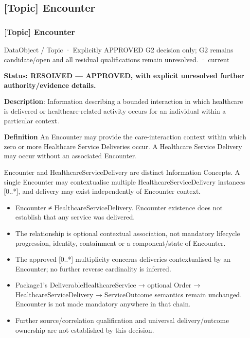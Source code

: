 \subsection{[Topic] Encounter}

\subsubsection{[Topic] Encounter}

\label{element:fb464349f13b41c4ae9920a743fc6c12}
{\small DataObject / Topic · Explicitly APPROVED G2 decision only; G2 remains candidate/open and all residual qualifications remain unresolved. · current}\par

\textbf{Status: RESOLVED — APPROVED, with explicit unresolved further authority/evidence details.}



\textbf{Description}: Information describing a bounded interaction in which healthcare is delivered or healthcare-related activity occurs for an individual within a particular context.



\textbf{Definition}
An Encounter may provide the care-interaction context within which zero or more Healthcare Service Deliveries occur. A Healthcare Service Delivery may occur without an associated Encounter.



Encounter and HealthcareServiceDelivery are distinct Information Concepts. A single Encounter may contextualise multiple HealthcareServiceDelivery instances [0..*], and delivery may exist independently of Encounter context.



\begin{itemize}


\item Encounter ≠ HealthcareServiceDelivery. Encounter existence does not establish that any service was delivered.

\item The relationship is optional contextual association, not mandatory lifecycle progression, identity, containment or a component/state of Encounter.

\item The approved [0..*] multiplicity concerns deliveries contextualised by an Encounter; no further reverse cardinality is inferred.

\item Package1's DeliverableHealthcareService → optional Order → HealthcareServiceDelivery → ServiceOutcome semantics remain unchanged. Encounter is not made mandatory anywhere in that chain.

\item Further source/correlation qualification and universal delivery/outcome ownership are not established by this decision.

\end{itemize}



